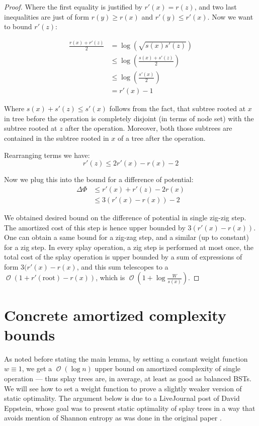 \documentclass[11pt]{article}
\DeclareMathOperator*{\Oh}{\mathcal{O}}
\begin{document}
\begin{proof}
Where the first equality is justified by $r'(x) = r(z)$, and two last inequalities are just of form $r(y) \geq r(x)$ and $r'(y) \leq r'(x)$. Now we want to bound $r'(z)$:

\begin{align*}
\frac{r(x) + r'(z)}{2} &= \log(\sqrt{s(x)s'(z)}) \\
	& \leq \log(\frac{s(x) + s'(z)}{2}) \\
	& \leq \log(\frac{s'(x)}{2}) \\
	& = r'(x) - 1
\end{align*}

Where $s(x) + s'(z) \leq s'(x)$ follows from the fact, that subtree rooted at $x$ in tree before the operation is completely disjoint (in terms of node set) with the subtree rooted at $z$ after the operation. Moreover, both those subtrees are contained in the subtree rooted in $x$ of a tree after the operation.

Rearranging terms we have:
\begin{equation*}
	r'(z) \leq 2r'(x) - r(x) - 2
\end{equation*}

Now we plug this into the bound for a difference of potential:
\begin{align*}
\Delta\Phi & \leq r'(x) + r'(z) - 2r(x) \\
	& \leq 3 (r'(x) - r(x)) - 2
\end{align*}

We obtained desired bound on the difference of potential in single zig-zig step. The amortized cost of this step is hence upper bounded by $3(r'(x) - r(x))$. One can obtain a same bound for a zig-zag step, and a similar (up to constant) for a zig step. In every splay operation, a zig step is performed at most once, the total cost of the splay operation is upper bounded by a sum of expressions of form $3(r'(x) - r(x)$, and this sum telescopes to a $\Oh(1 + r'(\mathrm{root}) - r(x))$, which is $\Oh(1 + \log\frac{W}{s(x)})$.
\end{proof}
\section{Concrete amortized complexity bounds}
As noted before stating the main lemma, by setting a constant weight function $w \equiv 1$, we get a $\Oh(\log n)$ upper bound on amortized complexity of single operation --- thus splay trees are, in average, at least as good as balanced BSTs. We will see how to set a weight function to prove a slightly weaker version of static optimality. The argument below is due to a LiveJournal post of David Eppstein, whose goal was to present static optimality of splay trees in a way that avoids mention of Shannon entropy as was done in the original paper \cite{DBLP:journals/jacm/SleatorT85}.
\end{document}
